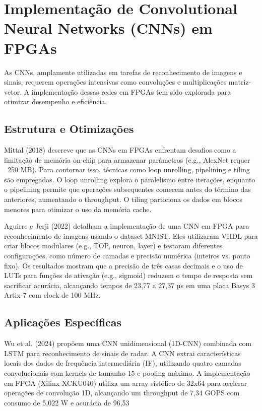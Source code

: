 \section{Implementação de Convolutional Neural Networks (CNNs) em FPGAs}
As CNNs, amplamente utilizadas em tarefas de reconhecimento de imagens e sinais, requerem operações intensivas como convoluções e multiplicações matriz-vetor. A implementação dessas redes em FPGAs tem sido explorada para otimizar desempenho e eficiência.

\subsection{Estrutura e Otimizações}
Mittal (2018) descreve que as CNNs em FPGAs enfrentam desafios como a limitação de memória on-chip para armazenar parâmetros (e.g., AlexNet requer ~250 MB). Para contornar isso, técnicas como loop unrolling, pipelining e tiling são empregadas. O loop unrolling explora o paralelismo entre iterações, enquanto o pipelining permite que operações subsequentes comecem antes do término das anteriores, aumentando o throughput. O tiling particiona os dados em blocos menores para otimizar o uso da memória cache.

Aguirre e Jerji (2022) detalham a implementação de uma CNN em FPGA para reconhecimento de imagens usando o dataset MNIST. Eles utilizaram VHDL para criar blocos modulares (e.g., TOP, neuron, layer) e testaram diferentes configurações, como número de camadas e precisão numérica (inteiros vs. ponto fixo). Os resultados mostram que a precisão de três casas decimais e o uso de LUTs para funções de ativação (e.g., sigmoid) reduzem o tempo de resposta sem sacrificar acurácia, alcançando tempos de 23,77 a 27,37 µs em uma placa Basys 3 Artix-7 com clock de 100 MHz.

\subsection{Aplicações Específicas}
Wu et al. (2024) propõem uma CNN unidimensional (1D-CNN) combinada com LSTM para reconhecimento de sinais de radar. A CNN extrai características locais dos dados de frequência intermediária (IF), utilizando quatro camadas convolucionais com kernels de tamanho 15 e pooling máximo. A implementação em FPGA (Xilinx XCKU040) utiliza um array sistólico de 32x64 para acelerar operações de convolução 1D, alcançando um throughput de 7,34 GOPS com consumo de 5,022 W e acurácia de 96,53%

